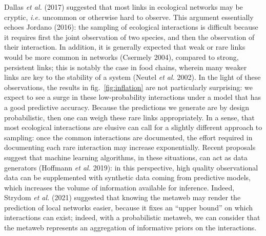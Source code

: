\documentclass[10pt,oneside]{article}
\begin{document}
Dallas \emph{et al.} (2017) suggested that most links in ecological
networks may be cryptic, \emph{i.e.} uncommon or otherwise hard to
observe. This argument essentially echoes Jordano (2016): the sampling
of ecological interactions is difficult because it requires first the
joint observation of two species, and then the observation of their
interaction. In addition, it is generally expected that weak or rare
links would be more common in networks (Csermely 2004), compared to
strong, persistent links; this is notably the case in food chains,
wherein many weaker links are key to the stability of a system (Neutel
\emph{et al.} 2002). In the light of these observations, the results in
fig.~\ref{fig:inflation} are not particularly surprising: we expect to
see a surge in these low-probability interactions under a model that has
a good predictive accuracy. Because the predictions we generate are by
design probabilistic, then one can weigh these rare links appropriately.
In a sense, that most ecological interactions are elusive can call for a
slightly different approach to sampling: once the common interactions
are documented, the effort required in documenting each rare interaction
may increase exponentially. Recent proposals suggest that machine
learning algorithms, in these situations, can act as data generators
(Hoffmann \emph{et al.} 2019): in this perspective, high quality
observational data can be supplemented with synthetic data coming from
predictive models, which increases the volume of information available
for inference. Indeed, Strydom \emph{et al.} (2021) suggested that
knowing the metaweb may render the prediction of local networks easier,
because it fixes an ``upper bound'' on which interactions can exist;
indeed, with a probabilistic metaweb, we can consider that the metaweb
represents an aggregation of informative priors on the interactions.
\end{document}
